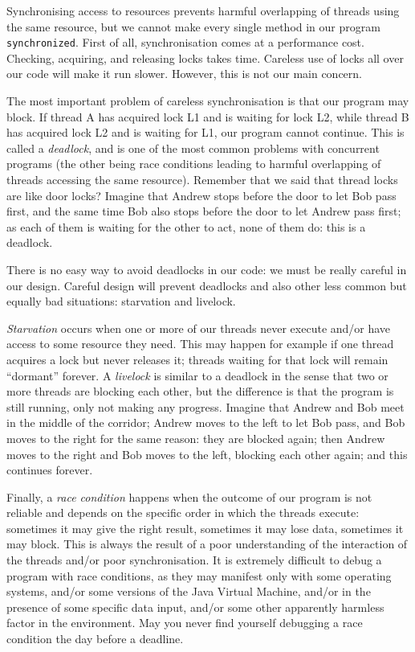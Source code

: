 Synchronising access to resources prevents harmful overlapping of
threads using the same resource, but we cannot make every single
method in our program \verb+synchronized+. First of all,
synchronisation comes at a performance cost. Checking, acquiring, and
releasing locks takes time. Careless use of locks all over our code
will make it run slower. However, this is not our main concern. 

The most important problem of careless synchronisation is that our
program may block. If thread A has acquired lock L1 and is waiting for
lock L2, while thread B has acquired lock L2 and is
waiting for L1, our program cannot continue. This is
called a \emph{deadlock}, and is one of the most common problems with
concurrent programs (the other being race conditions leading
to harmful overlapping of threads accessing the same resource). 
%
Remember that we said that thread locks are like door locks? Imagine
that Andrew stops before the door to let Bob pass first, and the same
time Bob also stops before the door to let Andrew pass first; as each
of them is waiting for the other to act, none of them do: this is a
deadlock.  

There is no easy way to avoid deadlocks in our code: we must be really
careful in our design. Careful design will prevent deadlocks and also 
other less common but equally bad situations: starvation and livelock. 

\emph{Starvation} occurs when one or more of our threads never execute
and/or have access to some resource they need. This may happen for
example if one thread acquires a lock but never releases it; threads
waiting for that lock will remain ``dormant'' forever.
%
A \emph{livelock} is similar to a deadlock in the sense that two or
more threads are blocking each other, but the difference is that the
program is still running, only not making any progress. Imagine that
Andrew and Bob meet in the middle of the corridor; Andrew moves to the
left to let Bob pass, and Bob moves to the right for the same reason:
they are blocked again; then Andrew moves to the right and Bob moves to
the left, blocking each other again; and this continues forever. 

Finally, a \emph{race condition} happens when the outcome of our
program is not reliable and depends on the specific order in which the
threads execute: sometimes it may give the right result, sometimes it
may lose data, sometimes it may block. This is always the result of a
poor understanding of the interaction of the threads and/or poor
synchronisation. It is extremely difficult to debug a program with
race conditions, as they may manifest only with some operating
systems, and/or some versions of the Java Virtual Machine, 
and/or in the presence of some specific data input, and/or
some other apparently harmless factor in the environment. May you
never find yourself debugging a race condition the day before a
deadline. 

